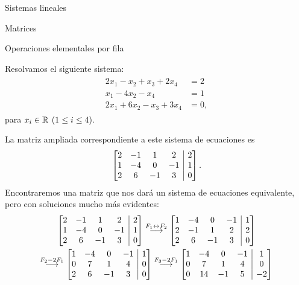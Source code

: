 \begin{chapter}{Sistemas lineales}
\begin{section}{Matrices}
\begin{subsection}{Operaciones elementales por fila}
                \begin{ejemplo*}\label{ejemplo2.11}
                    Resolvamos el siguiente sistema:
                    \begin{align}\label{sist-eq-01}
                    \begin{split}
                    2x_1 - x_2 + x_3 + 2x_4 &= 2 \\
                    x_1 - 4x_2 -x_4 &=1 \\
                    2x_1 +6x_2 -x_3 +3x_4 &= 0,  
                    \end{split}
                    \end{align}
                    para  $x_i \in \mathbb R$ ($1 \le i \le 4$). 
                
                    
                    La matriz ampliada  correspondiente a este sistema de ecuaciones es 
                    $$
                    \left[\begin{array}{@{}*{4}{c}|c@{}} 
                     2& -1&1& 2&2 \\ 1&-4 &0&-1&1 \\ 2&6&-1&3&0 \end{array}\right].
                    $$
                    Encontraremos una matriz que nos dará un sistema de ecuaciones equivalente, pero con soluciones mucho más evidentes:
                    \begin{multline*}
                    \left[\begin{array}{@{}*{4}{c}|c@{}}  2& -1&1& 2&2 \\ 1&-4 &0&-1&1 \\ 2&6&-1&3&0 \end{array}\right]
                    \stackrel{F_1\leftrightarrow F_2}{\longrightarrow} 
                    \left[\begin{array}{@{}*{4}{c}|c@{}}  1&-4 &0&-1&1 \\ 2& -1&1& 2&2 \\ 2&6&-1&3&0 \end{array}\right]
                    \\
                    \stackrel{F_2-2 F_1}{\longrightarrow} 
                    \left[\begin{array}{@{}*{4}{c}|c@{}}  1&-4 &0&-1&1 \\ 0& 7&1& 4&0 \\ 2&6&-1&3&0 \end{array}\right]
                    \stackrel{F_3-2 F_1}{\longrightarrow} 
                    \left[\begin{array}{@{}*{4}{c}|c@{}}  1&-4 &0&-1&1 \\ 0& 7&1& 4&0 \\ 0&14&-1&5&-2 \end{array}\right] 

\end{multline*}
\end{ejemplo*}
\end{subsection}
\end{section}
\end{chapter}
